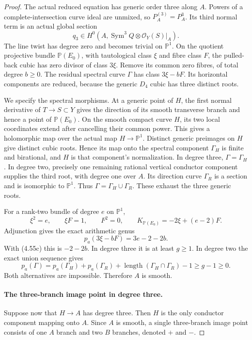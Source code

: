 \begin{proof}
The actual reduced equation has generic order three along
$A$. Powers of a complete-intersection curve ideal are
unmixed, so $P_A^{(3)}=P_A^3$. Its third normal term is an
actual global section
\[
 q_3\in H^0\!\left(A,
          \operatorname{Sym}^3 Q\otimes\mathcal O_Y(S)|_A\right).
\]
The line twist has degree zero and becomes trivial on
$\mathbb P^1$. On the quotient projective bundle
$\mathbb P(E_0)$, with tautological class $\xi$ and fibre
class $F$, the pulled-back cubic has zero divisor of class
$3\xi$. Remove its common zero fibres, of total degree
$b\ge0$. The residual spectral curve $\Gamma$ has class
$3\xi-bF$. Its horizontal components are reduced, because
the generic $D_4$ cubic has three distinct roots.

We specify the spectral morphisms. At a generic point of
$H$, the first normal derivative of $T\to S\subset Y$
gives the direction of its smooth transverse branch and
hence a point of $\mathbb P(E_0)$. On the smooth compact
curve $H$, its two local coordinates extend after cancelling
their common power. This gives a holomorphic map over the
actual map $H\to\mathbb P^1$. Distinct generic preimages
on $H$ give distinct cubic roots. Hence its map onto the
spectral component $\Gamma_H$ is finite and birational,
and $H$ is that component's normalization. In degree three,
$\Gamma=\Gamma_H$. In degree two, precisely one remaining
rational vertical conductor component supplies the third
root, with degree one over $A$. Its direction curve
$\Gamma_R$ is a section and is isomorphic to $\mathbb P^1$.
Thus $\Gamma=\Gamma_H\cup\Gamma_R$. These exhaust the
three generic roots.

For a rank-two bundle of degree $e$ on $\mathbb P^1$,
\[
 \xi^2=e,\qquad \xi F=1,\qquad F^2=0,\qquad
 K_{\mathbb P(E_0)}=-2\xi+(e-2)F.
\]
Adjunction gives the exact arithmetic genus
\[
                    p_a(3\xi-bF)=3e-2-2b.               \tag{4.55d}
\]
With (4.55c) this is $-2-2b$. In degree three it is at
least $g\ge1$. In degree two the exact union sequence gives
\[
 p_a(\Gamma)=p_a(\Gamma_H)+p_a(\Gamma_R)
           +\operatorname{length}(\Gamma_H\cap\Gamma_R)-1
       \ge g-1\ge0.
\]
Both alternatives are impossible. Therefore $A$ is smooth.

\paragraph{The three-branch image point in degree three.}
Suppose now that $H\to A$ has degree three. Then $H$ is
the only conductor component mapping onto $A$. Since $A$
is smooth, a single three-branch image point consists of
one $A$ branch and two $B$ branches, denoted $+$ and $-$.


\end{proof}
